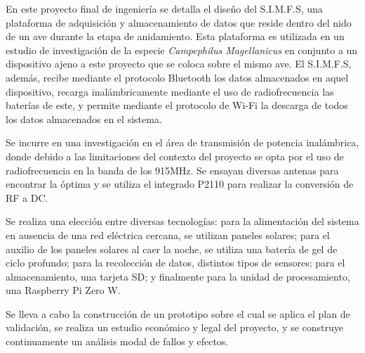 

En este proyecto final de ingeniería se detalla el diseño del S.I.M.F.S, una plataforma de adquisición y almacenamiento de datos que reside dentro del nido de un ave durante la etapa de anidamiento. Esta plataforma es utilizada en un estudio de investigación de la especie \textit{Campephilus Magellanicus} en conjunto a un dispositivo ajeno a este proyecto que se coloca sobre el mismo ave. El S.I.M.F.S, además, recibe mediante el protocolo Bluetooth los datos almacenados en aquel dispositivo, recarga inalámbricamente mediante el uso de radiofrecuencia las baterías de este, y permite mediante el protocolo de Wi-Fi la descarga de todos los datos almacenados en el sistema. 

Se incurre en una investigación en el área de transmisión de potencia inalámbrica, donde debido a las limitaciones del contexto del proyecto se opta por el uso de radiofrecuencia en la banda de los 915MHz. Se ensayan diversas antenas para encontrar la óptima y se utiliza el integrado P2110 para realizar la conversión de RF a DC.

Se realiza una elección entre diversas tecnologías: para la alimentación del sistema en ausencia de una red eléctrica cercana, se utilizan paneles solares; para el auxilio de los paneles solares al caer la noche, se utiliza una batería de gel de ciclo profundo; para la recolección de datos, distintos tipos de sensores; para el almacenamiento, una tarjeta SD; y finalmente para la unidad de procesamiento, una Raspberry Pi Zero W.

Se lleva a cabo la construcción de un prototipo sobre el cual se aplica el plan de validación, se realiza un estudio económico y legal del proyecto, y se construye continuamente un análisis modal de fallos y efectos.





%
